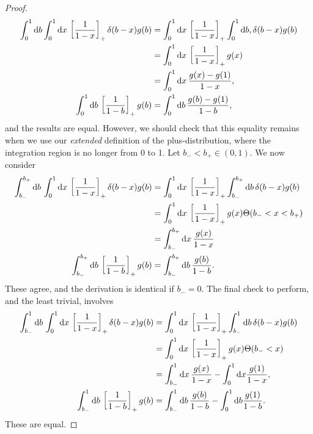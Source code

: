 \begin{subappendices}
\begin{example}{}
\begin{proof}
\begin{align}
    \int_0^1 \dd b \int_{0}^{1} \dd x\,\left[\frac{1}{1-x}\right]_+ \delta(b - x) g(b)
    &=
    \int_{0}^{1} \dd x\,\left[\frac{1}{1-x}\right]_+ \int_0^1 \dd b,\delta(b - x) g(b)
    \\
    \notag
    &=
    \int_{0}^{1} \dd x\,\left[\frac{1}{1-x}\right]_+ g(x)
    \\
    \notag
    &=
    \int_{0}^{1} \dd x\,\frac{g(x) - g(1)}{1-x}
    ,
    \\
    \int_0^1 \dd b \,\left[\frac{1}{1-b}\right]_+ g(b) &= \int_0^1 \dd b\, \frac{g(b) - g(1)}{1-b}
    ,
\end{align}
and the results are equal.
%
However, we should check that this equality remains when we use our \textit{extended} definition of the plus-distribution, where the integration region is no longer from 0 to 1.
%
Let \(b_- < b_+ \in (0,1)\).
%
We now consider
\begin{align}
    \int_{b_-}^{b_+}\dd b\,
    \int_0^1 \dd x\,
    \left[\frac{1}{1-x}\right]_+
    \delta(b - x) g(b)
    &=
    \int_{0}^1 \dd x\,
    \left[\frac{1}{1-x}\right]_+
    \int_{b_-}^{b_+}\dd b\,
    \delta(b - x) g(b)
    \\
    &=
    \notag
    \int_0^1 \dd x\,
    \left[\frac{1}{1-x}\right]_+ g(x) \Theta(b_- < x < b_+)
    \\
    &=
    \notag
    \int_{b_-}^{b_+} \dd x\, \frac{g(x)}{1-x}
    \\
    \int_{b_-}^{b_+}\dd b\,
    \left[\frac{1}{1-b}\right]_+ g(b)
    &=
    \int_{b_-}^{b_+} \dd b\, \frac{g(b)}{1-b}
    .
\end{align}
These agree, and the derivation is identical if \(b_- = 0\).
%
The final check to perform, and the least trivial, involves
\begin{align}
    \int_{b_-}^{1} \dd b \,
    \int_{0}^1 \dd x\,
    \left[\frac{1}{1-x}\right]_+
    \delta(b - x) g(b)
    &=
    \int_{0}^1 \dd x\,
    \left[\frac{1}{1-x}\right]_+
    \int_{b_-}^{1} \dd b\,
    \delta(b - x) g(b)
    \\
    &=
    \notag
    \int_0^1 \dd x\,
    \left[\frac{1}{1-x}\right]_+
    g(x) \Theta(b_- < x )
    \\
    &=
    \notag
    \int_{b_-}^{1} \dd x\, \frac{g(x)}{1-x}
    -
    \int_0^1 \dd x \frac{g(1)}{1-x}
    ,
    \\
    \int_{b_-}^{1} \dd b\,
    \left[\frac{1}{1-b}\right]_+ g(b)
    &=
    \int_{b_-}^{1} \dd b\, \frac{g(b)}{1-b}
    -
    \int_0^1 \dd b \frac{g(1)}{1-b}
    .
\end{align}
These are equal.
\end{proof}


\end{example}
\end{subappendices}
